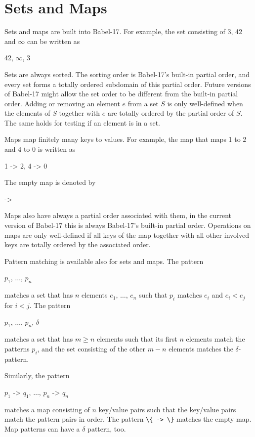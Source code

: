 \documentclass[11pt]{amsart}
\newcommand{\babelsrc}[1] {\lstinline!#1!}
\begin{document}
\section{Sets and Maps}\label{sec:setsandmaps}
Sets and maps are built into Babel-17. For example, the set consisting of 3, 42 and $\infty$ can be written as
\begin{babellisting}
{42, $\infty$, 3}
\end{babellisting}
Sets are always sorted. The sorting order is Babel-17's built-in partial order, and every set forms a totally ordered subdomain of this partial order. Future versions of Babel-17 might allow the set order to be different from the built-in partial order. Adding or removing an element $e$ from a set $S$ is only well-defined when the elements of $S$ together with $e$ are totally ordered by the partial order of $S$. The same holds for testing if an element is in a set. 

Maps map finitely many keys to values. For example, the map that maps 1 to 2 and 4 to 0 is written as
\begin{babellisting}
{1 -> 2, 4 -> 0}
\end{babellisting}
The empty map is denoted by 
\begin{babellisting}
{->}
\end{babellisting}
Maps also have always a partial order associated with them, in the current version of Babel-17 this is always Babel-17's built-in partial order.  Operations on maps are only well-defined if all keys of the map together with all other involved keys are totally ordered by the associated order. 

Pattern matching is available also for sets and maps. The pattern 
\begin{babellisting}
{$p_1$, $\ldots$, $p_n$}
\end{babellisting}
matches a set that has $n$ elements $e_1$, $\ldots$, $e_n$ such that $p_i$ matches $e_i$ and $e_i < e_j$ for $i < j$. The pattern
\begin{babellisting}
{$p_1$, $\ldots$, $p_n$, $\delta$}
\end{babellisting}
matches a set that has $m \ge n$ elements such that its first $n$ elements match the patterns $p_i$, and the set consisting of the other $m-n$ elements matches the $\delta$-pattern. 

Similarly, the pattern
\begin{babellisting}
{$p_1$ -> $q_1$, $\ldots$, $p_n$ -> $q_n$}
\end{babellisting}
matches a map consisting of $n$ key/value pairs such that the key/value pairs match the pattern pairs in order.
The pattern \babelsrc{\{ -> \}} matches the empty map. Map patterns can have a $\delta$ pattern, too.
\end{document}
